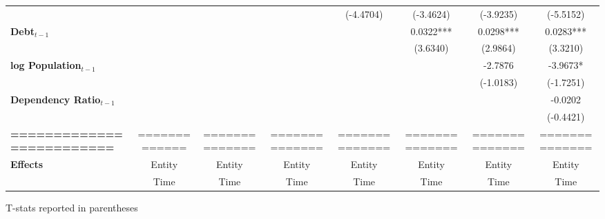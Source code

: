 \begin{center}
\begin{tabular}{lccccccc}
\textbf{ }                         &                   &                      &                           &     (-4.4704)      &    (-3.4624)    &         (-3.9235)         &          (-5.5152)            \\
\textbf{Debt$_{t-1}$}                &                   &                      &                           &                    &    0.0322***    &         0.0298***         &          0.0283***            \\
\textbf{ }                         &                   &                      &                           &                    &     (3.6340)    &          (2.9864)         &           (3.3210)            \\
\textbf{log Population$_{t-1}$}      &                   &                      &                           &                    &                 &          -2.7876          &           -3.9673*            \\
\textbf{ }                         &                   &                      &                           &                    &                 &         (-1.0183)         &          (-1.7251)            \\
\textbf{Dependency Ratio$_{t-1}$}   &                   &                      &                           &                    &                 &                           &           -0.0202             \\
\textbf{ }                         &                   &                      &                           &                    &                 &                           &          (-0.4421)            \\
\textbf{=========================} &   =============   &    ==============    &       ==============      &   ==============   &  ============== &       ==============      &        ==============         \\
\textbf{Effects}                   &       Entity      &        Entity        &           Entity          &       Entity       &      Entity     &           Entity          &            Entity             \\
\textbf{}                          &        Time       &         Time         &            Time           &        Time        &       Time      &            Time           &             Time              \\
\bottomrule
\end{tabular}
\end{center}

T-stats reported in parentheses